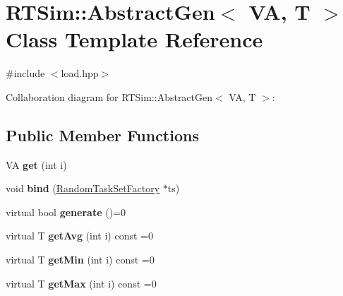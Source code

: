 \hypertarget{classRTSim_1_1AbstractGen}{}\section{R\+T\+Sim\+:\+:Abstract\+Gen$<$ VA, T $>$ Class Template Reference}
\label{classRTSim_1_1AbstractGen}


{\ttfamily \#include $<$load.\+hpp$>$}



Collaboration diagram for R\+T\+Sim\+:\+:Abstract\+Gen$<$ VA, T $>$\+:
\subsection*{Public Member Functions}
\begin{DoxyCompactItemize}
\item 
VA {\bfseries get} (int i)\hypertarget{classRTSim_1_1AbstractGen_a01da27daaac13fc2066a6818d1f58c93}{}\label{classRTSim_1_1AbstractGen_a01da27daaac13fc2066a6818d1f58c93}

\item 
void {\bfseries bind} (\hyperlink{classRTSim_1_1RandomTaskSetFactory}{Random\+Task\+Set\+Factory} $\ast$ts)\hypertarget{classRTSim_1_1AbstractGen_a30450f7fe2e17b7a957ec124d8811eff}{}\label{classRTSim_1_1AbstractGen_a30450f7fe2e17b7a957ec124d8811eff}

\item 
virtual bool {\bfseries generate} ()=0\hypertarget{classRTSim_1_1AbstractGen_a924bfd143ba3f83f773e30505dd04395}{}\label{classRTSim_1_1AbstractGen_a924bfd143ba3f83f773e30505dd04395}

\item 
virtual T {\bfseries get\+Avg} (int i) const =0\hypertarget{classRTSim_1_1AbstractGen_abbfc66f3e9918ce94f10c9782fbf452b}{}\label{classRTSim_1_1AbstractGen_abbfc66f3e9918ce94f10c9782fbf452b}

\item 
virtual T {\bfseries get\+Min} (int i) const =0\hypertarget{classRTSim_1_1AbstractGen_a9983f28193fcf259817d931a4f1581e4}{}\label{classRTSim_1_1AbstractGen_a9983f28193fcf259817d931a4f1581e4}

\item 
virtual T {\bfseries get\+Max} (int i) const =0\hypertarget{classRTSim_1_1AbstractGen_a245a27ef1e9daa0e4767cf37d1d375c5}{}\label{classRTSim_1_1AbstractGen_a245a27ef1e9daa0e4767cf37d1d375c5}

\end{DoxyCompactItemize}
